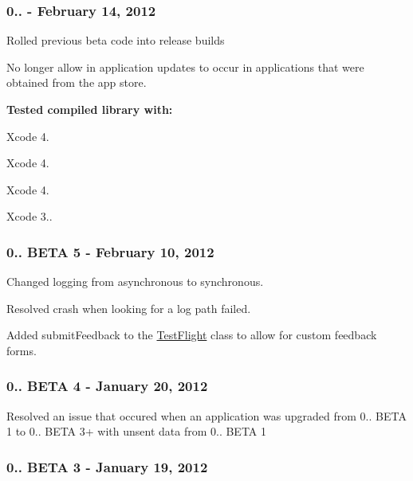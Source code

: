 \subsubsection*{0.. -\/ February 14, 2012}


\begin{DoxyItemize}
\item Rolled previous beta code into release builds
\item No longer allow in application updates to occur in applications that were obtained from the app store.
\end{DoxyItemize}

{\bfseries Tested compiled library with\-:}


\begin{DoxyItemize}
\item Xcode 4.
\item Xcode 4.
\item Xcode 4.
\item Xcode 3..
\end{DoxyItemize}

\subsubsection*{0.. B\-E\-T\-A 5 -\/ February 10, 2012}


\begin{DoxyItemize}
\item Changed logging from asynchronous to synchronous.
\item Resolved crash when looking for a log path failed.
\item Added submit\-Feedback to the \hyperlink{interface_test_flight}{Test\-Flight} class to allow for custom feedback forms.
\end{DoxyItemize}

\subsubsection*{0.. B\-E\-T\-A 4 -\/ January 20, 2012}


\begin{DoxyItemize}
\item Resolved an issue that occured when an application was upgraded from 0.. B\-E\-T\-A 1 to 0.. B\-E\-T\-A 3+ with unsent data from 0.. B\-E\-T\-A 1
\end{DoxyItemize}

\subsubsection*{0.. B\-E\-T\-A 3 -\/ January 19, 2012}


